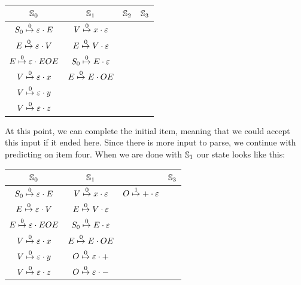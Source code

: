 		\begin{table}[h]
		\centering
		\begin{tabular}{|c|c|c|c|}
			\hline
			$\St{0}$                          & $\St{1}$ & $\St{2}$ & $\St{3}$ \\
			\hline
			$\earley{S_0}{\varepsilon}{E}{0}$ & $\earley{V}{x}{\varepsilon}{0}$   &  & \\
			$\earley{E}{\varepsilon}{V}{0}$   & $\earley{E}{V}{\varepsilon}{0}$   &  & \\
			$\earley{E}{\varepsilon}{EOE}{0}$ & $\earley{S_0}{E}{\varepsilon}{0}$ &  & \\
			$\earley{V}{\varepsilon}{x}{0}$   & $\earley{E}{E}{OE}{0}$            &  & \\
			$\earley{V}{\varepsilon}{y}{0}$   &                                   &  & \\
			$\earley{V}{\varepsilon}{z}{0}$   &                                   &  & \\
			\hline
		\end{tabular}
		\end{table}

		At this point, we can complete the initial item, meaning that we could
		accept this input if it ended here. Since there is more input to parse,
		we continue with predicting on item four. When we are done with
		$\St{1}$ our state looks like this:

		\begin{table}[H]
		\centering
		\begin{tabular}{|c|c|c|c|}
			\hline
			$\St{0}$                          & $\St{1}$                          &\St{2} & $\St{3}$ \\
			\hline
			$\earley{S_0}{\varepsilon}{E}{0}$ & $\earley{V}{x}{\varepsilon}{0}$   & $\earley{O}{+}{\varepsilon}{1}$ & \\
			$\earley{E}{\varepsilon}{V}{0}$   & $\earley{E}{V}{\varepsilon}{0}$   & & \\
			$\earley{E}{\varepsilon}{EOE}{0}$ & $\earley{S_0}{E}{\varepsilon}{0}$ & & \\
			$\earley{V}{\varepsilon}{x}{0}$   & $\earley{E}{E}{OE}{0}$            & & \\
			$\earley{V}{\varepsilon}{y}{0}$   & $\earley{O}{\varepsilon}{+}{0}$   & & \\
			$\earley{V}{\varepsilon}{z}{0}$   & $\earley{O}{\varepsilon}{-}{0}$   & & \\
			\hline
		\end{tabular}
		\end{table}

